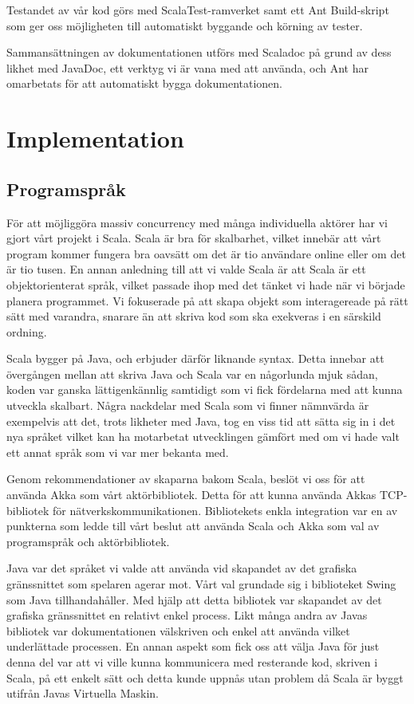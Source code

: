 \documentclass[a4paper]{article}
\begin{document}
Testandet av vår kod görs med ScalaTest-ramverket samt ett Ant Build-skript som ger oss möjligheten till automatiskt byggande och körning av tester.

Sammansättningen av dokumentationen utförs med Scaladoc på grund av dess likhet med JavaDoc, ett verktyg vi är vana med att använda, och Ant har omarbetats för att automatiskt bygga dokumentationen.

\section{Implementation}

\subsection{Programspråk}
För att möjliggöra massiv concurrency med många individuella aktörer har vi gjort vårt projekt i Scala. Scala är bra för skalbarhet, vilket innebär att vårt program kommer fungera bra oavsätt om det är tio användare online eller om det är tio tusen. En annan anledning till att vi valde Scala är att Scala är ett objektorienterat språk, vilket passade ihop med det tänket vi hade när vi började planera programmet. Vi fokuserade på att skapa objekt som interagereade på rätt sätt med varandra, snarare än att skriva kod som ska exekveras i en särskild ordning.

Scala bygger på Java, och erbjuder därför liknande syntax. Detta innebar att övergången mellan att skriva Java och Scala var en någorlunda mjuk sådan, koden var ganska lättigenkännlig samtidigt som vi fick fördelarna med att kunna utveckla skalbart. Några nackdelar med Scala som vi finner nämnvärda är exempelvis att det, trots likheter med Java, tog en viss tid att sätta sig in i det nya 
språket vilket kan ha motarbetat utvecklingen gämfört med om vi hade valt ett annat språk som vi var mer bekanta med.

Genom rekommendationer av skaparna bakom Scala, beslöt vi oss för att använda Akka som vårt aktörbibliotek. Detta för att kunna använda Akkas TCP-bibliotek för nätverkskommunikationen. Bibliotekets enkla integration var en av punkterna som ledde till vårt beslut att använda Scala och Akka som val av programspråk och aktörbibliotek.

Java var det språket vi valde att använda vid skapandet av det grafiska gränssnittet som spelaren agerar mot. Vårt val grundade sig i biblioteket Swing som Java tillhandahåller. 
Med hjälp att detta bibliotek var skapandet av det grafiska gränssnittet en relativt enkel process. Likt många andra av Javas bibliotek var dokumentationen välskriven och enkel 
att använda vilket underlättade processen. En annan aspekt som fick oss att välja Java för just denna del var att vi ville kunna kommunicera med resterande kod, skriven i Scala, 
på ett enkelt sätt och detta kunde uppnås utan problem då Scala är byggt utifrån Javas Virtuella Maskin. 
\end{document}
